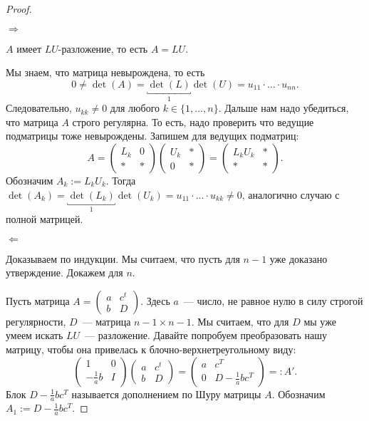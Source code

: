 \begin{proof}~

    $\Longrightarrow$ 
    
    $A$ имеет $LU$-разложение, то есть $A = LU$.
    
    Мы знаем, что матрица невырождена, то есть 
    \begin{equation*}
        0 \neq \det(A) = \underbracket{\det(L)}_1 \det(U) = u_{11} \cdot \ldots \cdot u_{nn}.
    \end{equation*}
    Следовательно, $u_{kk} \neq 0$ для любого $k \in \{1, \dots, n\}$. Дальше нам надо убедиться, что матрица $A$ строго регулярна. То есть, надо проверить что ведущие подматрицы тоже невырождены. Запишем для ведущих подматриц:
    \begin{equation*}
        A = \begin{pmatrix}
            L_k & 0 \\
            * & *
        \end{pmatrix} \begin{pmatrix}
            U_k & * \\
            0 & *
        \end{pmatrix} = \begin{pmatrix}
            L_k U_k & * \\
            * & *
        \end{pmatrix}.
    \end{equation*}
    Обозначим $A_k := L_k U_k$. Тогда $\det(A_k) = \underbracket{\det(L_k)}_1 \det(U_k) = u_{11} \cdot \ldots \cdot u_{kk} \neq 0$, аналогично случаю с полной матрицей.

    $\Longleftarrow$
    
    Доказываем по индукции. Мы считаем, что пусть для $n-1$ уже доказано утверждение. Докажем для $n$.

    Пусть матрица $A = \begin{pmatrix}
        a & c^t \\
        b & D
    \end{pmatrix}$. Здесь $a$~--- число, не равное нулю в силу строгой регулярности, $D$~--- матрица $n - 1 \times n - 1$. Мы считаем, что для $D$ мы уже умеем искать $LU$~--- разложение. Давайте попробуем преобразовать нашу матрицу, чтобы она привелась к блочно-верхнетреугольному виду:
    \begin{equation*}
        \begin{pmatrix}
            1 & 0 \\[2pt]
            -\frac{1}{a}b & I
        \end{pmatrix} \begin{pmatrix}
            a & c^t \\
            b & D
        \end{pmatrix} = \begin{pmatrix}
            a & c^T \\
            0 & D - \frac{1}{a}bc^T
        \end{pmatrix} =: A'.
    \end{equation*}
    Блок $D - \frac{1}{a}bc^T$ называется дополнением по Шуру матрицы $A$. Обозначим $A_1 := D - \frac{1}{a}bc^T$. 
    

\end{proof}
